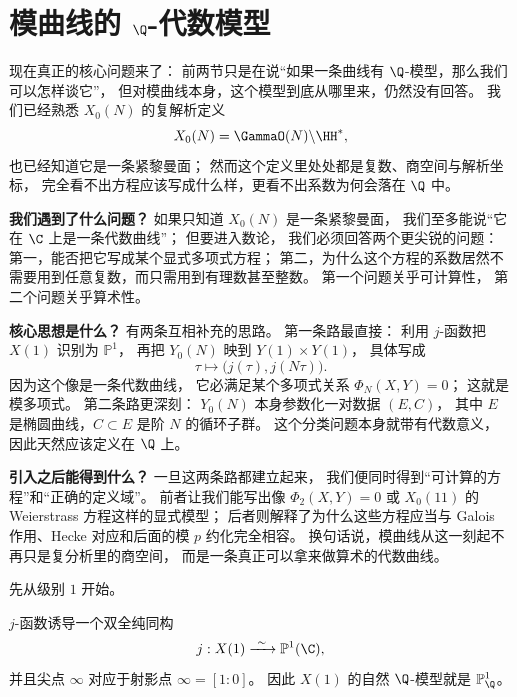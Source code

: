 \section{模曲线的 $\Q$-代数模型}
\label{sec:ch07-modular-curves-over-q}

现在真正的核心问题来了：
前两节只是在说“如果一条曲线有 $\Q$-模型，那么我们可以怎样谈它”，
但对模曲线本身，这个模型到底从哪里来，仍然没有回答。
我们已经熟悉 $X_0(N)$ 的复解析定义
\[
  X_0(N)=\GammaO(N)\backslash \HH^*,
\]
也已经知道它是一条紧黎曼面；
然而这个定义里处处都是复数、商空间与解析坐标，
完全看不出方程应该写成什么样，更看不出系数为何会落在 $\Q$ 中。

\textbf{我们遇到了什么问题？}
如果只知道 $X_0(N)$ 是一条紧黎曼面，
我们至多能说“它在 $\C$ 上是一条代数曲线”；
但要进入数论，
我们必须回答两个更尖锐的问题：
第一，能否把它写成某个显式多项式方程；
第二，为什么这个方程的系数居然不需要用到任意复数，而只需用到有理数甚至整数。
第一个问题关乎可计算性，
第二个问题关乎算术性。

\textbf{核心思想是什么？}
有两条互相补充的思路。
第一条路最直接：
利用 $j$-函数把 $X(1)$ 识别为 $\mathbb P^1$，
再把 $Y_0(N)$ 映到 $Y(1)\times Y(1)$，
具体写成
\[
  \tau\longmapsto \bigl(j(\tau),j(N\tau)\bigr).
\]
因为这个像是一条代数曲线，
它必满足某个多项式关系 $\Phi_N(X,Y)=0$；
这就是模多项式。
第二条路更深刻：
$Y_0(N)$ 本身参数化一对数据 $(E,C)$，
其中 $E$ 是椭圆曲线，$C\subset E$ 是阶 $N$ 的循环子群。
这个分类问题本身就带有代数意义，
因此天然应该定义在 $\Q$ 上。

\textbf{引入之后能得到什么？}
一旦这两条路都建立起来，
我们便同时得到“可计算的方程”和“正确的定义域”。
前者让我们能写出像 $\Phi_2(X,Y)=0$ 或 $X_0(11)$ 的 Weierstrass 方程这样的显式模型；
后者则解释了为什么这些方程应当与 Galois 作用、Hecke 对应和后面的模 $p$ 约化完全相容。
换句话说，模曲线从这一刻起不再只是复分析里的商空间，
而是一条真正可以拿来做算术的代数曲线。



先从级别 $1$ 开始。

\begin{proposition}[$X(1)$ 由 $j$ 参数化]
\label{prop:ch07-x1-j}
$j$-函数诱导一个双全纯同构
\[
  j:X(1)\xrightarrow{\ \sim\ } \mathbb P^1(\C),
\]
并且尖点 $\infty$ 对应于射影点 $\infty=[1:0]$。
因此 $X(1)$ 的自然 $\Q$-模型就是 $\mathbb P^1_{\Q}$。
\end{proposition}

